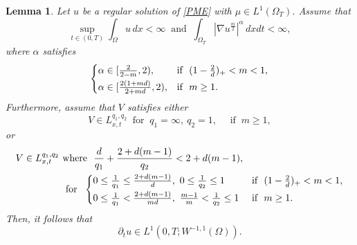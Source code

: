 \documentclass{amsart}
\newtheorem{lemma}[defn]{Lemma}
\numberwithin{equation}{section}
\begin{document}
\begin{lemma}\label{time derivative}
Let $u$ be a regular solution of \eqref{PME} with $\mu\in L^1(\Omega_T)$. Assume that
\begin{equation}\label{u_FC}
\sup_{t\in (0, T)} \int_{\Omega} u \,dx < \infty \ \text{ and } \  \int_{\Omega_T} |\nabla u^{\frac{m}{2}}|^{\alpha} \,dxdt < \infty,
\end{equation}
where $\alpha$ satisfies 
\begin{equation}\label{alpha01}
\begin{cases}
	\alpha \in [\frac{2}{2-m},2), & \text{if } \ (1-\frac{2}{d})_{+} < m < 1, \vspace{1mm}\\
	\alpha \in [\frac{2(1+md)}{2+md},2), & \text{if }\ m \geq 1.
\end{cases}
\end{equation}
Furthermore, assume that $V$ satisfies either
\begin{equation}\label{V:uV01}
V \in L_{x,t}^{q_1,q_2} \ \text{ for } \ q_1 = \infty, \ q_2 =1, \quad \text{ if } \ m \geq 1,
\end{equation}
or
\begin{equation}\label{V:uV02}
\begin{aligned}
V \in L_{x,t}^{q_1,q_2}  & \text{ where } \ \frac{d}{q_1} + \frac{2+d(m-1)}{q_2} < 2+d(m-1), \vspace{1mm} \\
& \  \text{ for }\
\begin{cases}
 0 \leq \frac{1}{q_1} \leq \frac{2 + d(m-1)}{d}, \
0\leq \frac{1}{q_2} \leq 1  & \text{ if } \ (1-\frac{2}{d})_{+}< m < 1, \vspace{1mm}\\
 0 \leq \frac{1}{q_1} < \frac{2 + d(m-1)}{md}, \
\frac{m - 1}{m} < \frac{1}{q_2} \leq 1 & \text{ if } \ m \geq 1.
\end{cases}
\end{aligned}
\end{equation}
Then, it follows that
\[
\partial_t u \in L^{1}(0,T;  W^{-1,1}(\Omega)).
\]
\end{lemma}
\end{document}

